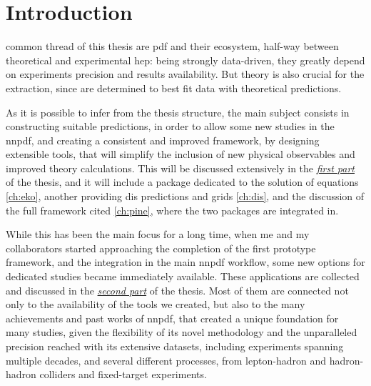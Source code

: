 
\cleardoublepage
{}

\chapter*{Introduction}
%
	{}

 common thread of this thesis are \acrfull{pdf} and their
ecosystem, half-way between theoretical and experimental \acrfull{hep}: being
strongly data-driven, they greatly depend on experiments precision and results
availability.
But theory is also crucial for the extraction, since  are
determined to best fit data with theoretical predictions.

As it is possible to infer from the thesis structure, the main subject consists
in constructing suitable predictions, in order to allow some new studies
in the \acrlong{nnpdf}, and creating a consistent and improved framework, by
designing extensible tools, that will simplify the inclusion of new physical
observables and improved theory calculations.
This will be discussed extensively in the \hyperref[part:th]{\textit{first
part}} of the thesis, and it will include a package dedicated to the solution
of \dglap equations \cref{ch:eko}, another providing \acrfull{dis} predictions
and grids \cref{ch:dis}, and the discussion of the full framework cited
\cref{ch:pine}, where the two packages are integrated in.

While this has been the main focus for a long time, when me and my
collaborators started approaching the completion of the first prototype
framework, and the integration in the main \acrshort{nnpdf} workflow, some new
options for dedicated studies became immediately available.
These applications are collected and discussed in the
\hyperref[part:app]{\textit{second part}} of the thesis.
Most of them are connected not only to the availability of the tools we
created, but also to the many achievements and past works of \acrshort{nnpdf},
that created a unique foundation for many studies, given the flexibility of its
novel methodology and the unparalleled precision reached with its extensive
datasets, including experiments spanning multiple decades, and several
different processes, from lepton-hadron and hadron-hadron colliders and
fixed-target experiments.

